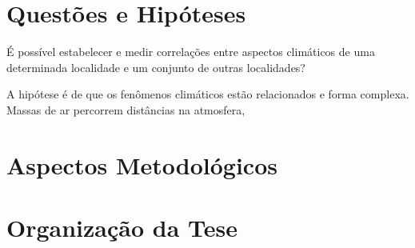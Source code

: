\section{Questões e Hipóteses}
\label{sec:questoes}

É possível estabelecer e medir correlações entre aspectos climáticos de uma determinada localidade e um conjunto de outras localidades?

A hipótese é de que os fenômenos climáticos estão relacionados e forma complexa. Massas de ar percorrem distâncias na atmosfera, 

\section{Aspectos Metodológicos}
\label{sec:metodologia}


\section{Organização da Tese}
\label{sec:organizacao}
